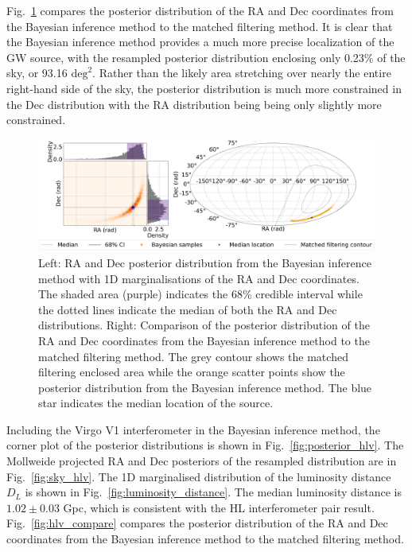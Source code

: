 \documentclass[11pt,a4paper]{article}
\begin{document}
Fig.~\ref{fig:hl_compare} compares the posterior distribution of the RA and Dec coordinates from the Bayesian inference method to the matched filtering method. It is clear that the Bayesian inference method provides a much more precise localization of the GW source, with the resampled posterior distribution enclosing only 0.23\% of the sky, or 93.16 $\mathrm{deg}^2$. Rather than the likely area stretching over nearly the entire right-hand side of the sky, the posterior distribution is much more constrained in the Dec distribution with the RA distribution being being only slightly more constrained.

\begin{landscape}
\begin{figure}
    \includegraphics[width=\columnwidth, keepaspectratio]{../figures/radec_posterior_HL.png}
    \caption{Left: RA and Dec posterior distribution from the Bayesian inference method with 1D marginalisations of the RA and Dec coordinates. The shaded area (purple) indicates the 68\% credible interval while the dotted lines indicate the median of both the RA and Dec distributions. Right: Comparison of the posterior distribution of the RA and Dec coordinates from the Bayesian inference method to the matched filtering method. The grey contour shows the matched filtering enclosed area while the orange scatter points show the posterior distribution from the Bayesian inference method. The blue star indicates the median location of the source.}
    \label{fig:hl_compare}
\end{figure}
\end{landscape}

\clearpage
Including the Virgo V1 interferometer in the Bayesian inference method, the corner plot of the posterior distributions is shown in Fig.~\ref{fig:posterior_hlv}. The Mollweide projected RA and Dec posteriors of the resampled distribution are in Fig.~\ref{fig:sky_hlv}. The 1D marginalised distribution of the luminosity distance $D_L$ is shown in Fig.~\ref{fig:luminosity_distance}. The median luminosity distance is $1.02 \pm 0.03$ Gpc, which is consistent with the HL interferometer pair result. Fig.~\ref{fig:hlv_compare} compares the posterior distribution of the RA and Dec coordinates from the Bayesian inference method to the matched filtering method. 
\end{document}
